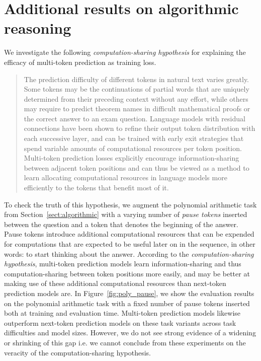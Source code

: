 \section{Additional results on algorithmic reasoning}
\label{app:poly}
We investigate the following \emph{computation-sharing hypothesis} for explaining the efficacy of multi-token prediction as training loss.
\begin{quote}
    The prediction difficulty of different tokens in natural text varies greatly. Some tokens may be the continuations of partial words that are uniquely determined from their preceding context without any effort, while others may require to predict theorem names in difficult mathematical proofs or the correct answer to an exam question. Language models with residual connections have been shown to refine their output token distribution with each successive layer, and can be trained with early exit strategies that spend variable amounts of computational resources per token position. Multi-token prediction losses explicitly encourage information-sharing between adjacent token positions and can thus be viewed as a method to learn allocating computational resources in language models more efficiently to the tokens that benefit most of it.
\end{quote}
To check the truth of this hypothesis, we augment the polynomial arithmetic task from Section~\ref{sect:algorithmic} with a varying number of \emph{pause tokens} \citep{goyal2023think} inserted between the question and a token that denotes the beginning of the answer. Pause tokens introduce additional computational resources that can be expended for computations that are expected to be useful later on in the sequence, in other words: to start thinking about the answer. According to the \emph{computation-sharing hypothesis}, multi-token prediction models learn information-sharing and thus computation-sharing between token positions more easily, and may be better at making use of these additional computational resources than next-token prediction models are. In Figure~\ref{fig:poly_pause}, we show the evaluation results on the polynomial arithmetic task with a fixed number of pause tokens inserted both at training and evaluation time. Multi-token prediction models likewise outperform next-token prediction models on these task variants across task difficulties and model sizes. However, we do not see strong evidence of a widening or shrinking of this gap i.e. we cannot conclude from these experiments on the veracity of the computation-sharing hypothesis.

